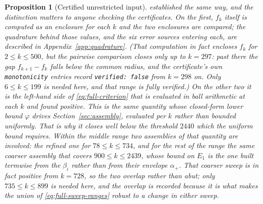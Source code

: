 \documentclass[11pt]{amsart}
\theoremstyle{plain}
\newtheorem{proposition}[theorem]{Proposition}
\theoremstyle{definition}
\begin{document}
\begin{proposition}[Certified unrestricted input]
established the same way, and the distinction matters to anyone checking the
certificates. On the first, $f_k$ itself is computed as an enclosure for each
$k$ and the two enclosures are compared; the quadrature behind those values,
and the six error sources entering each, are described in
Appendix~\ref{app:quadrature}. (That computation in fact encloses $f_k$ for
$2\leq k\leq500$, but the pairwise comparison closes only up to $k=297$: past
there the gap $f_{k+1}-f_k$ falls below the common radius, and the
certificate's own \texttt{monotonicity} entries record \texttt{verified:
false} from $k=298$ on. Only $6\leq k\leq199$ is needed here, and that range
is fully verified.) On the other two it is the left-hand
side of \eqref{eq:full-criterion} that is evaluated in ball arithmetic at each
$k$ and found positive. This is the same quantity whose closed-form lower
bound $\varphi$ drives Section~\ref{sec:assembly}, evaluated per $k$ rather
than bounded uniformly. That is why it closes well below the threshold $2440$
which the uniform bound requires. Within the middle range two assemblies of
that quantity are involved: the refined one for $78\leq k\leq734$, and for the
rest of the range the same coarser assembly that covers $900\leq k\leq2439$,
whose bound on $E_1$ is the one built termwise from the $\beta_i$ rather than
from their envelope $\alpha_+$. That coarser sweep is in fact positive from
$k=728$, so the two overlap rather than abut; only $735\leq k\leq899$ is needed
here, and the overlap is recorded because it is what makes the union of
\eqref{eq:full-sweep-ranges} robust to a change in either sweep.
\end{proposition}
\end{document}

